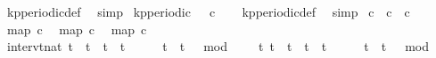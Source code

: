 \begin{isabellebody}
\ kp{\isacharunderscore}periodic{\isacharunderscore}def\ \isamarkupfalse%
\ simp%
\endisatagproof
{\isafoldproof}%
%
\isadelimproof
\isanewline
%
\endisadelimproof
\isanewline
{}\isamarkupfalse%
\ {\isacartoucheopen}kp{\isacharunderscore}periodic\ {}\ {}\ c{}{\isacartoucheclose}\isanewline
%
\isadelimproof
\ \ %
\endisadelimproof
%
\isatagproof
{}\isamarkupfalse%
\ kp{\isacharunderscore}periodic{\isacharunderscore}def\ \isamarkupfalse%
\ simp%
\endisatagproof
{\isafoldproof}%
%
\isadelimproof
\isanewline
%
\endisadelimproof
\isanewline
{}\isamarkupfalse%
\ {\isacartoucheopen}c{}\ {\isasymequiv}\ c{}\ {\isasymoplus}\ c{}{\isacartoucheclose}\isanewline
\isanewline
{}\isamarkupfalse%
\ {\isacartoucheopen}map\ c{}\ {\isacharbrackleft}{}{\isacharcomma}{}{\isacharcomma}{}{\isacharcomma}{}{\isacharcomma}{}{\isacharcomma}{}{\isacharcomma}{}{\isacharcomma}{}{\isacharcomma}{}{\isacharcomma}{}{\isacharcomma}{}{}{\isacharbrackright}{\isacartoucheclose}\isanewline
{}\isamarkupfalse%
\ {\isacartoucheopen}map\ c{}\ {\isacharbrackleft}{}{\isacharcomma}{}{\isacharcomma}{}{\isacharcomma}{}{\isacharcomma}{}{\isacharcomma}{}{\isacharcomma}{}{\isacharcomma}{}{\isacharcomma}{}{\isacharcomma}{}{\isacharcomma}{}{}{\isacharbrackright}{\isacartoucheclose}\isanewline
{}\isamarkupfalse%
\ {\isacartoucheopen}map\ c{}\ {\isacharbrackleft}{}{\isacharcomma}{}{\isacharcomma}{}{\isacharcomma}{}{\isacharcomma}{}{\isacharcomma}{}{\isacharcomma}{}{\isacharcomma}{}{\isacharcomma}{}{\isacharcomma}{}{\isacharcomma}{}{}{\isacharbrackright}{\isacartoucheclose}\isanewline
\isanewline
{}\isamarkupfalse%
\ interv{\isacharunderscore}{}{\isacharcolon}{\isacartoucheopen}{\isacharbraceleft}t{\isacharcolon}{\isacharcolon}nat{\isachardot}\ t\ {\isasymle}\ t\ {\isasymand}\ t\ {\isacharless}\ t\ {\isacharplus}\ {}\ {\isasymand}\ {}\ {\isasymle}\ t\ {\isasymand}\ {\isacharparenleft}t\ {\isacharminus}\ {}{\isacharparenright}\ mod\ {}\ {\isacharequal}\ {}{\isacharbraceright}\ {\isacharequal}\ {\isacharbraceleft}t{\isachardot}\ {\isacharparenleft}t\ {\isacharequal}\ t\ {\isasymor}\ t\ {\isacharequal}\ t\ {\isacharplus}\ {}{\isacharparenright}\ {\isasymand}\ {}\ {\isasymle}\ t\ {\isasymand}\ {\isacharparenleft}t\ {\isacharminus}\ {}{\isacharparenright}\ mod\ {}\ {\isacharequal}\ {}{\isacharbraceright}{\isacartoucheclose}\isanewline

\end{isabellebody}
